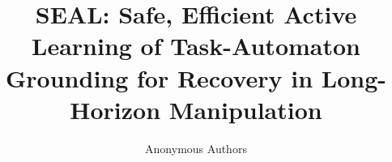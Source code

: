 \documentclass[journal]{IEEEtran}
\theoremstyle{definition}
\theoremstyle{plain}
\theoremstyle{remark}
\begin{document}
\title{SEAL: Safe, Efficient Active Learning of Task-Automaton\\ Grounding for Recovery in Long-Horizon Manipulation}

\author{Anonymous Authors%
}

\maketitle















\end{document}
